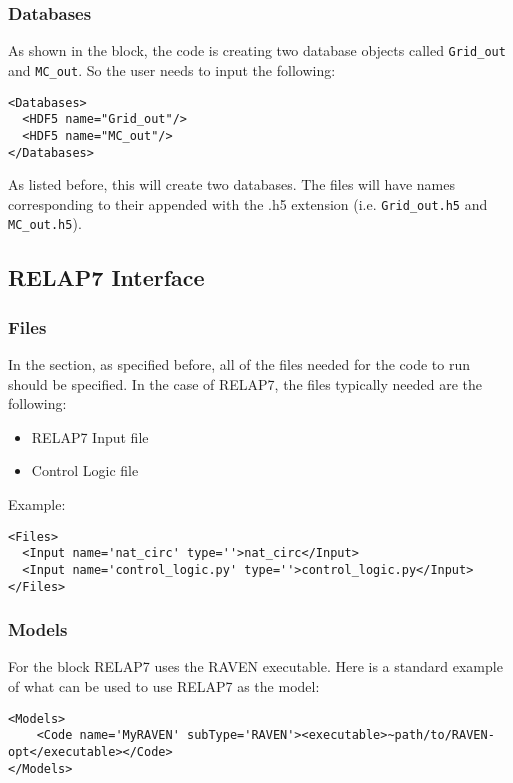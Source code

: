 \subsubsection{Databases}
As shown in the  block, the code is creating two database objects
called \texttt{Grid\_out} and \texttt{MC\_out}.
%
So the user needs to input the following:
\begin{lstlisting}[style=XML]
<Databases>
  <HDF5 name="Grid_out"/>
  <HDF5 name="MC_out"/>
</Databases>
\end{lstlisting}
As listed before, this will create two databases.
%
The files will have names corresponding to their  appended with
the .h5 extension (i.e. \texttt{Grid\_out.h5} and \texttt{MC\_out.h5}).
\subsection{RELAP7 Interface}
\subsubsection{Files}
In the  section, as specified before, all of the files needed for
the code to run should be specified.
%
In the case of RELAP7, the files typically needed are the following:
\begin{itemize}
  \item RELAP7 Input file
  \item Control Logic file
\end{itemize}
Example:
\begin{lstlisting}[style=XML]
<Files>
  <Input name='nat_circ' type=''>nat_circ</Input>
  <Input name='control_logic.py' type=''>control_logic.py</Input>
</Files>
\end{lstlisting}
\subsubsection{Models}
For the  block RELAP7 uses the RAVEN executable.
%
Here is a standard example of what can be used to use RELAP7 as the model:
\begin{lstlisting}[style=XML]
<Models>
    <Code name='MyRAVEN' subType='RAVEN'><executable>~path/to/RAVEN-opt</executable></Code>
</Models>
\end{lstlisting}

